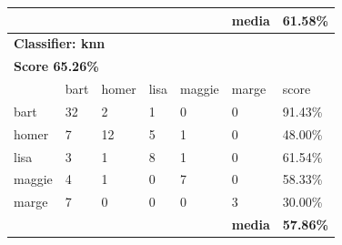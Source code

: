 \documentclass[paper=a4, fontsize=11pt]{scrartcl} %
\numberwithin{equation}{section} %
\numberwithin{figure}{section} %
\numberwithin{table}{section} %
\begin{document}
\begin{table}[!htb]
\begin{tabular}{l|l|l|l|l|l|l}
          &           &           &           &           & \textbf{media} & \textbf{61.58\%} \\ \hline
\multicolumn{7}{l}{\textbf{Classifier: knn}}                                                \\ \hline
\multicolumn{7}{l}{\textbf{Score 65.26\%}}                                                  \\ \hline
          & bart      & homer     & lisa      & maggie    & marge          & score            \\ \hline
bart      & 32        & 2         & 1         & 0         & 0              & 91.43\%          \\ \hline
homer     & 7         & 12        & 5         & 1         & 0              & 48.00\%          \\ \hline
lisa      & 3         & 1         & 8         & 1         & 0              & 61.54\%          \\ \hline
maggie    & 4         & 1         & 0         & 7         & 0              & 58.33\%          \\ \hline
marge     & 7         & 0         & 0         & 0         & 3              & 30.00\%          \\ \hline
          &           &           &           & \textbf{} & \textbf{media} & \textbf{57.86\%} \\ \hline
\end{tabular}
\end{table}
\end{document}
